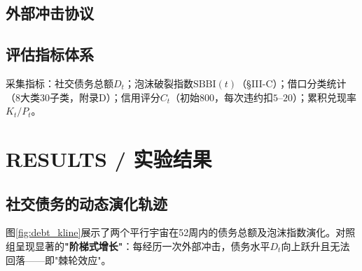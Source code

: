 \documentclass[journal]{IEEEtran}
\newcommand{\citet}[1]{\cite{#1}}
\begin{document}
\subsection{外部冲击协议}

\begin{table}[ht]
\begin{center}
\caption{五类外部冲击事件。}
\label{tab:shocks}
\small
{}
\end{center}
\end{table}
\normalsize

\subsection{评估指标体系}

采集指标：社交债务总额$D_t$；泡沫破裂指数$\text{SBBI}(t)$（\S III-C）；借口分类统计（8大类30子类，附录D）；信用评分$C_t$（初始800，每次违约扣$5\text{--}20$）；累积兑现率$K_t/P_t$。

\section{RESULTS / 实验结果}

\subsection{社交债务的动态演化轨迹}

图\ref{fig:debt_kline}展示了两个平行宇宙在52周内的债务总额及泡沫指数演化。对照组呈现显著的\textbf{"阶梯式增长"}：每经历一次外部冲击，债务水平$D_t$向上跃升且无法回落——即"棘轮效应"\citet{ratchet_effect}。
\end{document}
